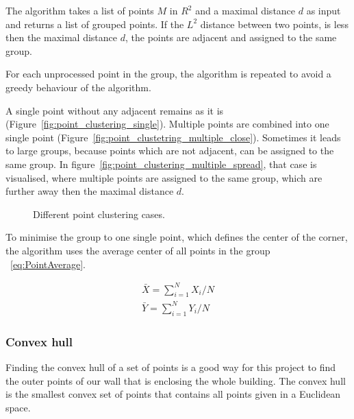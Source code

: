 The algorithm takes a list of points $M$ in $R^2$ and a maximal distance $d$ as input and returns a list of grouped points. If the $L^2$ distance between two points, is less then the maximal distance $d$, the points are adjacent and assigned to the same group.

For each unprocessed point in the group, the algorithm is repeated to avoid a greedy behaviour of the algorithm.

A single point without any adjacent remains as it is (Figure~\ref{fig:point_clustering_single}). Multiple points are combined into one single point (Figure~\ref{fig:point_clustetring_multiple_close}). Sometimes it leads to large groups, because points which are not adjacent, can be assigned to the same group. In figure~\ref{fig:point_clustering_multiple_spread}, that case is visualised, where multiple points are assigned to the same group, which are further away then the maximal distance $d$.

\begin{figure}[h!]
	\centering
	\hfill
	\hfill
	\caption{Different point clustering cases.}
	\label{fig:PointClusteringCases}
\end{figure}

To minimise the group to one single point, which defines the center of the corner, the algorithm uses the average center of all points in the group ~\eqref{eq:PointAverage}.


\begin{equation} \label{eq:PointAverage}
\begin{gathered}
\bar{X} = \sum_{i=1}^{N}X_{i}/N
\\
\bar{Y} = \sum_{i=1}^{N}Y_{i}/N
\end{gathered}
\end{equation}


\subsubsection{Convex hull}
\label{sub:ConvexHull}
Finding the convex hull of a set of points is a good way for this project to find the outer points of our wall that is enclosing the whole building. The convex hull is the smallest convex set of points that contains all points given in a Euclidean space.

